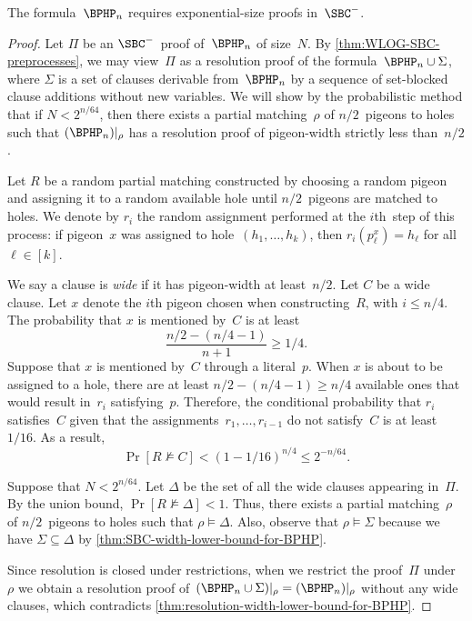 \documentclass[12pt]{article}
\begin{document}
\begin{theorem}\label{thm:SBC-size-lower-bound-for-BPHP}
  The formula~$\BPHP_n$ requires exponential-size proofs in~$\SBC^-$.
\end{theorem}
\begin{proof}
  Let $\Pi$ be an $\SBC^-$~proof of~$\BPHP_n$ of size~$N$.
  By \cref{thm:WLOG-SBC-preprocesses}, we may view~$\Pi$
  as a resolution proof of the formula~$\BPHP_n \cup \Sigma$,
  where $\Sigma$ is a set of clauses derivable from~$\BPHP_n$
  by a sequence of set-blocked clause additions without new variables.
  We will show by the probabilistic method that if $N < 2^{n / 64}$,
  then there exists a partial matching~$\rho$ of $n / 2$~pigeons to holes
  such that $(\BPHP_n)|_\rho$ has a resolution proof
  of pigeon-width strictly less than~$n / 2$.

  Let $R$ be a random partial matching constructed by
  choosing a random pigeon and assigning it to a random available hole
  until $n / 2$~pigeons are matched to holes.
  We denote by $r_i$ the random assignment
  performed at the $i$th~step of this process:
  if pigeon~$x$ was assigned to hole~$(h_1, \dots, h_k)$,
  then $r_i(p^x_\ell) = h_\ell$ for all~$\ell \in [k]$.

  We say a clause is \emph{wide} if it has pigeon-width at least~$n / 2$.
  Let $C$ be a wide clause.
  Let $x$ denote the $i$th pigeon chosen when constructing~$R$, with $i \leq n / 4$.
  The probability that $x$ is mentioned by~$C$ is at least
  \begin{equation*}
    \frac{n/2 - (n/4 - 1)}{n + 1} \geq 1/4.
  \end{equation*}
  Suppose that $x$ is mentioned by~$C$ through a literal~$p$.
  When $x$ is about to be assigned to a hole, there are
  at least $n / 2 - (n / 4 - 1) \geq n / 4$ available ones
  that would result in~$r_i$ satisfying~$p$.
  Therefore, the conditional probability that $r_i$ satisfies~$C$
  given that the assignments~$r_1, \dots, r_{i - 1}$ do not satisfy~$C$
  is at least~$1 / 16$.
  As a result,
  \begin{equation*}
    \Pr[R \not\models C] < (1 - 1 / 16)^{n / 4} \leq 2^{-n / 64}.
  \end{equation*}

  Suppose that $N < 2^{n / 64}$.
  Let $\Delta$ be the set of all the wide clauses appearing in~$\Pi$.
  By the union bound, $\Pr[R \not\models \Delta] < 1$.
  Thus, there exists a partial matching~$\rho$
  of $n / 2$~pigeons to holes such that $\rho \models \Delta$.
  Also, observe that $\rho \models \Sigma$
  because we have $\Sigma \subseteq \Delta$
  by \cref{thm:SBC-width-lower-bound-for-BPHP}.

  Since resolution is closed under restrictions,
  when we restrict the proof~$\Pi$ under~$\rho$ we obtain
  a resolution proof of~$(\BPHP_n \cup \Sigma)|_\rho = (\BPHP_n)|_\rho$
  without any wide clauses, which contradicts
  \cref{thm:resolution-width-lower-bound-for-BPHP}.
\end{proof}
\end{document}
